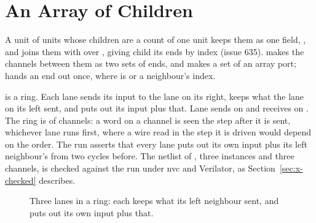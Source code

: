 \section{An Array of Children}
\label{sec:x-lanes}

A unit of units whose children are a count of one unit keeps them as
one field, , and joins them with
 over , giving child
 its ends by index (issue 635).  makes
the  channels between them as two sets of ends, and
 makes a set of an array port;  hands
an end out once, where  is  or a neighbour's index.

 is a ring. Each lane sends its input to the lane on
its right, keeps what the lane on its left sent, and puts out its
input plus that. Lane  sends on  and receives on
. The ring is of channels: a word on a
channel is seen the step after it is sent, whichever lane runs first,
where a wire read in the step it is driven would depend on the order.
The run asserts that every lane puts out its own input plus its left
neighbour's from two cycles before. The netlist of ,
three instances and three channels, is checked against the run under
nvc and Verilator, as Section~\ref{sec:x-checked} describes.

\begin{figure}[htbp]
\centering

\caption{Three lanes in a ring: each keeps what its left neighbour
sent, and puts out its own input plus that.}
\label{fig:x-lanes}
\end{figure}




